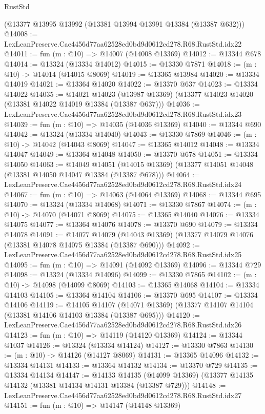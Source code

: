 \begin{lexlean}{RustStd}
\begin{coremodule}
    (@13377 @13995 @13992 (@13381 @13994 @13991 @13384 (@13387 @632)))
@14008 := LexLeanPreserve.Cae4456d77aa62528ed0bd9d0612cd278.R68.RustStd.idx22
@14011 := fun (m : @10) => @14007 (@14008 @13369)
@14012 := @13344 @678
@14014 := @13324 (@13334 @14012)
@14015 := @13330 @7871
@14018 := (m : @10) -> @14014 (@14015 @8069)
@14019 := @13365 @13984
@14020 := @13334 @14019
@14021 := @13364 @14020
@14022 := @13370 @637
@14023 := @13334 @14022
@14035 := @14021
    @14023
    (@13987 @13369)
    (@13377 @14023 @14020 (@13381 @14022 @14019 @13384 (@13387 @637)))
@14036 := LexLeanPreserve.Cae4456d77aa62528ed0bd9d0612cd278.R68.RustStd.idx23
@14039 := fun (m : @10) => @14035 (@14036 @13369)
@14040 := @13344 @690
@14042 := @13324 (@13334 @14040)
@14043 := @13330 @7869
@14046 := (m : @10) -> @14042 (@14043 @8069)
@14047 := @13365 @14012
@14048 := @13334 @14047
@14049 := @13364 @14048
@14050 := @13370 @678
@14051 := @13334 @14050
@14063 := @14049
    @14051
    (@14015 @13369)
    (@13377 @14051 @14048 (@13381 @14050 @14047 @13384 (@13387 @678)))
@14064 := LexLeanPreserve.Cae4456d77aa62528ed0bd9d0612cd278.R68.RustStd.idx24
@14067 := fun (m : @10) => @14063 (@14064 @13369)
@14068 := @13344 @695
@14070 := @13324 (@13334 @14068)
@14071 := @13330 @7867
@14074 := (m : @10) -> @14070 (@14071 @8069)
@14075 := @13365 @14040
@14076 := @13334 @14075
@14077 := @13364 @14076
@14078 := @13370 @690
@14079 := @13334 @14078
@14091 := @14077
    @14079
    (@14043 @13369)
    (@13377 @14079 @14076 (@13381 @14078 @14075 @13384 (@13387 @690)))
@14092 := LexLeanPreserve.Cae4456d77aa62528ed0bd9d0612cd278.R68.RustStd.idx25
@14095 := fun (m : @10) => @14091 (@14092 @13369)
@14096 := @13344 @729
@14098 := @13324 (@13334 @14096)
@14099 := @13330 @7865
@14102 := (m : @10) -> @14098 (@14099 @8069)
@14103 := @13365 @14068
@14104 := @13334 @14103
@14105 := @13364 @14104
@14106 := @13370 @695
@14107 := @13334 @14106
@14119 := @14105
    @14107
    (@14071 @13369)
    (@13377 @14107 @14104 (@13381 @14106 @14103 @13384 (@13387 @695)))
@14120 := LexLeanPreserve.Cae4456d77aa62528ed0bd9d0612cd278.R68.RustStd.idx26
@14123 := fun (m : @10) => @14119 (@14120 @13369)
@14124 := @13344 @1037
@14126 := @13324 (@13334 @14124)
@14127 := @13330 @7863
@14130 := (m : @10) -> @14126 (@14127 @8069)
@14131 := @13365 @14096
@14132 := @13334 @14131
@14133 := @13364 @14132
@14134 := @13370 @729
@14135 := @13334 @14134
@14147 := @14133
    @14135
    (@14099 @13369)
    (@13377 @14135 @14132 (@13381 @14134 @14131 @13384 (@13387 @729)))
@14148 := LexLeanPreserve.Cae4456d77aa62528ed0bd9d0612cd278.R68.RustStd.idx27
@14151 := fun (m : @10) => @14147 (@14148 @13369)

\end{coremodule}
\end{lexlean}
